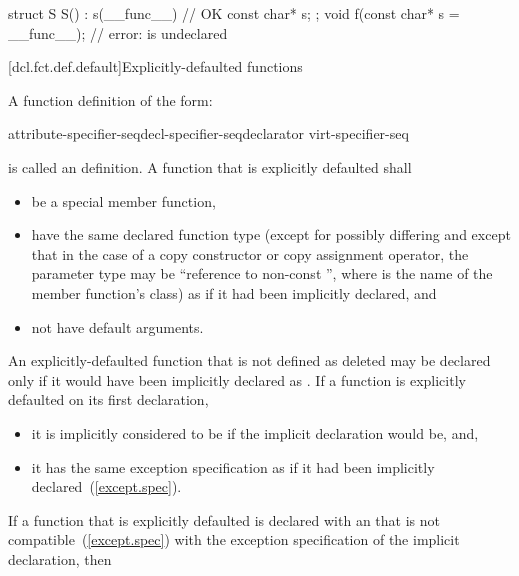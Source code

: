 \begin{example}
\begin{codeblock}
struct S {
  S() : s(__func__) { }             // OK
  const char* s;
};
void f(const char* s = __func__);  // error:  is undeclared
\end{codeblock}
\end{example}

[dcl.fct.def.default]{Explicitly-defaulted functions}%

\pnum
A function definition of the form:

\begin{ncbnf}
    attribute-specifier-seq\opt decl-specifier-seq\opt declarator virt-specifier-seq\opt{} 
\end{ncbnf}

is called an  definition.
A function that is explicitly defaulted shall

\begin{itemize}
\item be a special member function,

\item have the same declared function type (except for possibly differing
 and except that in the case of a copy constructor or
copy assignment operator, the parameter type may be ``reference to non-const '',
where  is the name of the member function's class) as if it had been implicitly
declared, and

\item not have default arguments.
\end{itemize}

\pnum
An explicitly-defaulted function that is not defined as deleted may be declared
 only if it would have been implicitly declared as
. If
a function is explicitly defaulted on its first declaration,

\begin{itemize}
\item it is implicitly considered to be  if the implicit
declaration would be, and,
\item it has the same exception specification
as if it had been implicitly declared~(\ref{except.spec}).
\end{itemize}

\pnum
If a function that is explicitly defaulted is declared with an
 that is not compatible~(\ref{except.spec})
with the exception specification of the implicit declaration, then

